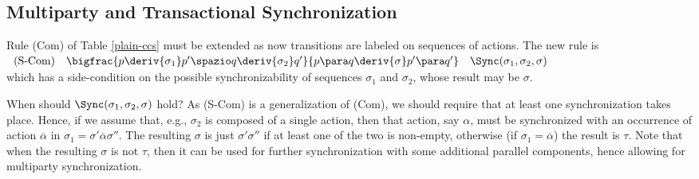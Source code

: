 % 



\subsection{Multiparty and Transactional Synchronization}

Rule (Com) of Table \ref{plain-ccs} must be extended as now transitions are labeled on sequences of actions.
The new rule is\\

$\begin{array}{lcllcl}
\mbox{(S-Com)}  & \bigfrac{p\deriv{\sigma_1} p'\spazio q\deriv{\sigma_2}q'}{p
\para q \deriv{\sigma}p'\para q'} & \Sync(\sigma_1,  \sigma_2, \sigma) \\
\end{array}$\\

\noindent
which has a side-condition on the possible synchronizability of sequences $\sigma_1$ and $\sigma_2$, whose result may be $\sigma$.

When should $\Sync(\sigma_1, \sigma_2, \sigma)$ hold? As (S-Com) is a generalization of (Com),  we should require that at least one synchronization takes place. Hence, if we assume that, e.g., $ \sigma_2$ is composed of a single action, then that action, say $\alpha$, must be synchronized with an occurrence of action $\overline{\alpha}$ in $\sigma_1 = \sigma' \overline{\alpha} \sigma''$. The resulting $\sigma$ is just $\sigma' \sigma''$  if at least one of the two is non-empty, otherwise (if $\sigma_1 = \overline{\alpha}$) the result is $\tau$. Note that when the resulting $\sigma$ is not $\tau$, then it can be used for further synchronization with some additional parallel components, hence allowing for multiparty synchronization.

